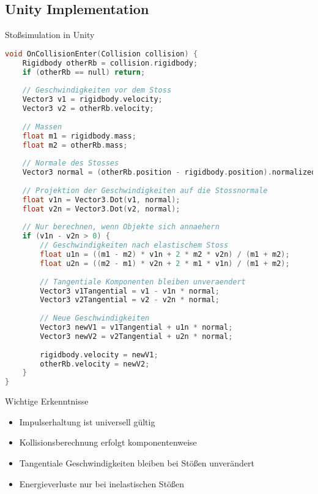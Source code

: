 \subsection{Unity Implementation}

\begin{code}{Stoßsimulation in Unity}
\begin{lstlisting}[language=C, style=basesmol]
void OnCollisionEnter(Collision collision) {
    Rigidbody otherRb = collision.rigidbody;
    if (otherRb == null) return;
    
    // Geschwindigkeiten vor dem Stoss
    Vector3 v1 = rigidbody.velocity;
    Vector3 v2 = otherRb.velocity;
    
    // Massen
    float m1 = rigidbody.mass;
    float m2 = otherRb.mass;
    
    // Normale des Stosses
    Vector3 normal = (otherRb.position - rigidbody.position).normalized;
    
    // Projektion der Geschwindigkeiten auf die Stossnormale
    float v1n = Vector3.Dot(v1, normal);
    float v2n = Vector3.Dot(v2, normal);
    
    // Nur berechnen, wenn Objekte sich annaehern
    if (v1n - v2n > 0) {
        // Geschwindigkeiten nach elastischem Stoss
        float u1n = ((m1 - m2) * v1n + 2 * m2 * v2n) / (m1 + m2);
        float u2n = ((m2 - m1) * v2n + 2 * m1 * v1n) / (m1 + m2);
        
        // Tangentiale Komponenten bleiben unveraendert
        Vector3 v1Tangential = v1 - v1n * normal;
        Vector3 v2Tangential = v2 - v2n * normal;
        
        // Neue Geschwindigkeiten
        Vector3 newV1 = v1Tangential + u1n * normal;
        Vector3 newV2 = v2Tangential + u2n * normal;
        
        rigidbody.velocity = newV1;
        otherRb.velocity = newV2;
    }
}
\end{lstlisting}
\end{code}

\begin{concept}{Wichtige Erkenntnisse}
    \begin{itemize}
        \item Impulserhaltung ist universell gültig
        \item Kollisionsberechnung erfolgt komponentenweise
        \item Tangentiale Geschwindigkeiten bleiben bei Stößen unverändert
        \item Energieverluste nur bei inelastischen Stößen
    \end{itemize}
\end{concept}